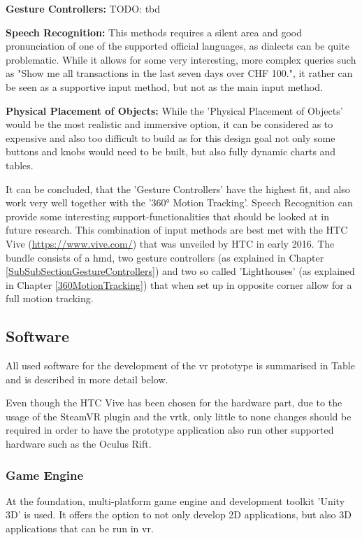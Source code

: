 \textbf{Gesture Controllers:}
TODO: tbd

\textbf{Speech Recognition:}
This methods requires a silent area and good pronunciation of one of the supported official languages, as dialects can be quite problematic. While it allows for some very interesting, more complex queries such as "Show me all transactions in the last seven days over CHF 100.", it rather can be seen as a supportive input method, but not as the main input method.

\textbf{Physical Placement of Objects:}
While the 'Physical Placement of Objects' would be the most realistic and immersive option, it can be considered as to expensive and also too difficult to build as for this design goal not only some buttons and knobs would need to be built, but also fully dynamic charts and tables.


It can be concluded, that the 'Gesture Controllers' have the highest fit, and also work very well together with the '360° Motion Tracking'. Speech Recognition can provide some interesting support-functionalities that should be looked at in future research. \newline
This combination of input methods are best met with the HTC Vive (\url{https://www.vive.com/}) that was unveiled by HTC in early 2016. The bundle consists of a \gls{hmd}, two gesture controllers (as explained in Chapter \ref{SubSubSectionGestureControllers}) and two so called 'Lighthouses' (as explained in Chapter \ref{360MotionTracking}) that when set up in opposite corner allow for a full motion tracking.




\subsection{Software}

All used software for the development of the \gls{vr} prototype is summarised in Table and is described in more detail below.


Even though the HTC Vive has been chosen for the hardware part, due to the usage of the SteamVR plugin and the \gls{vrtk}, only little to none changes should be required in order to have the prototype application also run other supported hardware such as the Oculus Rift.



\subsubsection{Game Engine}
At the foundation, \cite{Unity2016} multi-platform game engine and development toolkit 'Unity 3D' is used. It offers the option to not only develop 2D applications, but also 3D applications that can be run in \gls{vr}.

